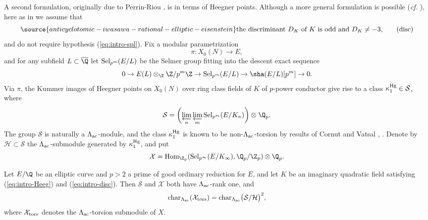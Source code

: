 A second formulation, originally due to Perrin-Riou \cite{perrinriou}, is in terms of Heegner points. Although a more general formulation is possible (\emph{cf.} \cite[\S{2.3}]{CMpconverse}), here as in \cite{perrinriou} we assume that
\begin{equation}\label{eq:intro-disc}
\source{anticyclotomic-iwasawa-rational-elliptic-eisenstein}
\textrm{the discriminant $D_K$ of $K$ is odd and $D_K\neq -3$,}\tag{disc}
\end{equation}
and do not require hypothesis (\ref{eq:intro-spl}). Fix a modular parametrization
\[
\pi:X_0(N)\rightarrow E,
\]
and for any subfield $L\subset\overline{\Q}$ let ${\rm Sel}_{p^m}(E/L)$ be the Selmer group fitting into the descent exact sequence
\[
0\rightarrow E(L)\otimes_{\Z}\Z/p^m\Z\rightarrow{\rm Sel}_{p^m}(E/L)\rightarrow\sha(E/L)[p^m]\rightarrow 0.
\]
Via $\pi$, the Kummer images of Heegner points on $X_0(N)$ over ring class fields of $K$ of $p$-power conductor give rise to a class $\kappa_1^{\rm Hg}\in\mathcal{S}$, where
\[
\mathcal{S}=\biggl(\varprojlim_n\varprojlim_m{\rm Sel}_{p^m}(E/K_n)\biggr)\otimes_{}\Q_p.
\]
{The group $\mathcal{S}$ is naturally a $\Lambda_{\rm ac}$-module, and} the class $\kappa_1^{\rm Hg}$ is known to be non-$\Lambda_{\rm ac}$-torsion by results of Cornut and Vatsal \cite{cornut}, \cite{vatsal}. Denote by $\mathcal{H}\subset\mathcal{S}$ the $\Lambda_{\rm ac}$-submodule generated by $\kappa_1^{\rm Hg}$, and put
\[
\mathcal{X}={\rm Hom}_{\Z_p}({\rm Sel}_{p^\infty}(E/K_\infty),\Q_p/\Z_p)\otimes\Q_p.
\]


\begin{conj}
\notready\label{conj:PR}
Let $E/\Q$ be an elliptic curve and $p>2$ a prime of good ordinary reduction for $E$, and let $K$ be an imaginary quadratic field satisfying {\rm(\ref{eq:intro-Heeg})} and {\rm(\ref{eq:intro-disc})}. Then $\mathcal{S}$ and $\mathcal{X}$ both
have $\Lambda_{\rm ac}$-rank one, and
\[
{\rm char}_{\Lambda_{\rm ac}}(\mathcal{X}_{\rm tors})={\rm char}_{\Lambda_{\rm ac}}\bigl(\mathcal{S}/\mathcal{H}\bigr)^2,
\]
where $\mathcal{X}_{\rm tors}$ denotes the $\Lambda_{\rm ac}$-torsion submodule of $X$.
\end{conj}

